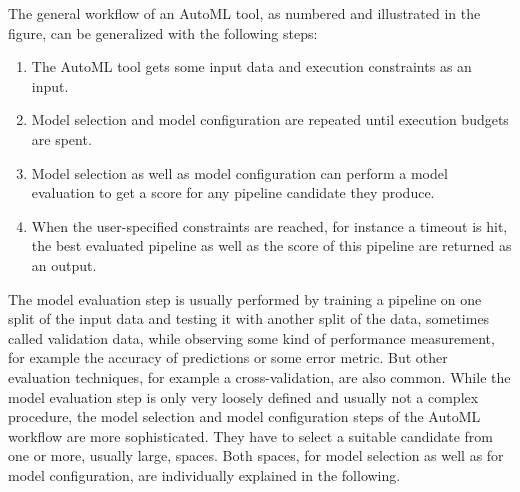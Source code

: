 The general workflow of an AutoML tool, as numbered and illustrated in the figure, can be generalized with the following steps:
\begin{enumerate}
    \item The AutoML tool gets some input data and execution constraints as an input.
    \item Model selection and model configuration are repeated until execution budgets are spent.
    \item Model selection as well as model configuration can perform a model evaluation to get a score for any pipeline candidate they produce.
    \item When the user-specified constraints are reached, for instance a timeout is hit, the best evaluated pipeline as well as the score of this pipeline are returned as an output.
\end{enumerate}
The model evaluation step is usually performed by training a pipeline on one split of the input data and testing it with another split of the data, sometimes called validation data, while observing some kind of performance measurement, for example the accuracy of predictions or some error metric.
But other evaluation techniques, for example a cross-validation, are also common.\newline
While the model evaluation step is only very loosely defined and usually not a complex procedure, the model selection and model configuration steps of the AutoML workflow are more sophisticated.
They have to select a suitable candidate from one or more, usually large, spaces. 
Both spaces, for model selection as well as for model configuration, are individually explained in the following.

